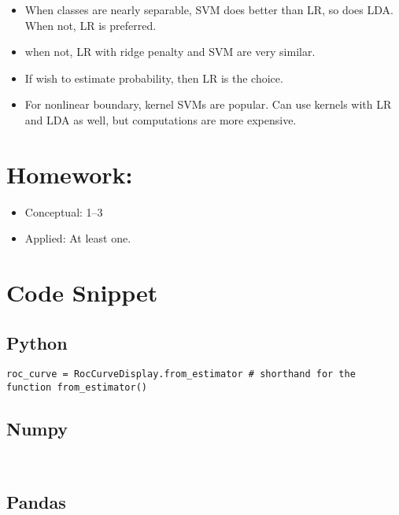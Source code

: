 \documentclass[
  letterpaper,
  DIV=11,
  numbers=noendperiod]{scrreprt}
\providecommand{\tightlist}{%
  \setlength{\itemsep}{0pt}\setlength{\parskip}{0pt}}\usepackage{longtable,booktabs,array}
\begin{document}
\begin{itemize}
\tightlist
\item
  When classes are nearly separable, SVM does better than LR, so does
  LDA. When not, LR is preferred.
\item
  when not, LR with ridge penalty and SVM are very similar.
\item
  If wish to estimate probability, then LR is the choice.
\item
  For nonlinear boundary, kernel SVMs are popular. Can use kernels with
  LR and LDA as well, but computations are more expensive.
\end{itemize}

\section{Homework:}\label{homework-5}

\begin{itemize}
\tightlist
\item
  Conceptual: 1--3
\item
  Applied: At least one.
\end{itemize}

\section{Code Snippet}\label{code-snippet-3}

\subsection{Python}\label{python-7}

\begin{verbatim}
roc_curve = RocCurveDisplay.from_estimator # shorthand for the function from_estimator()
\end{verbatim}

\subsection{Numpy}\label{numpy-7}

\begin{verbatim}


\end{verbatim}

\subsection{Pandas}\label{pandas-7}
\end{document}
